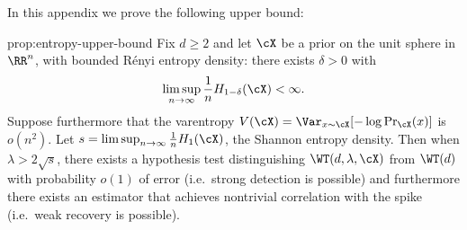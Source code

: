 \documentclass{article}
\begin{document}
In this appendix we prove the following upper bound:
\begin{repproposition}{prop:entropy-upper-bound}
Fix $d\ge 2$ and let $\cX$ be a prior on the unit sphere in $\RR^n$, with bounded R\'enyi entropy density: there exists $\delta > 0$ with 
$$ \limsup_{n \to \infty} \frac1n H_{1-\delta}(\cX) < \infty. $$
Suppose furthermore that the varentropy $V(\cX) = \Var_{x \sim \cX}[-\log \Pr_\cX(x)]$ is $o(n^2)$.
Let $s = \limsup_{n \to \infty} \frac{1}{n} H_1(\cX)$, the Shannon entropy density. Then when $\lambda > 2\sqrt{s}$, there exists a hypothesis test distinguishing $\WT(d,\lambda,\cX)$ from $\WT(d)$ with probability $o(1)$ of error (i.e.\ strong detection is possible) and furthermore there exists an estimator that achieves nontrivial correlation with the spike (i.e.\ weak recovery is possible).
\end{repproposition}
\end{document}
